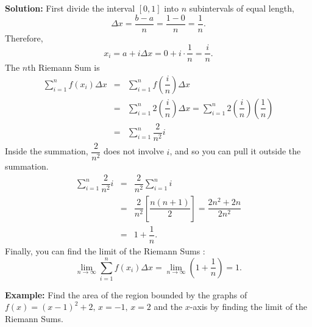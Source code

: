 \documentclass[titlepage,a4paper,12pt]{report}
\begin{document}
\noindent \textbf{Solution:} First divide the interval $[0,1]$ into $n$ subintervals of equal length, 
\begin{equation*}
\Delta x =\dfrac{b-a}{n}=\dfrac{1-0}{n}=\dfrac{1}{n}.
\end{equation*}
Therefore, 
\begin{equation*}
x_i=a+i\Delta x =0+i\cdot \dfrac{1}{n}=\dfrac{i}{n}.
\end{equation*}
The $n$th Riemann Sum is 
\begin{eqnarray*}
\sum _{i=1}^n f(x_i)\Delta x &=& \sum _{i=1}^n f\left(\dfrac{i}{n}\right) \Delta x \\
&=& \sum _{i=1}^n 2\left(\dfrac{i}{n}\right) \Delta x =\sum _{i=1}^n 2\left(\dfrac{i}{n}\right)\left(\dfrac{1}{n}\right)\\
&=&\sum _{i=1}^n \dfrac{2}{n^2}i
\end{eqnarray*}
Inside the summation, $\dfrac{2}{n^2}$ does not involve $i$, and so you can pull it outside the summation.
\begin{eqnarray*}
\sum _{i=1}^n \dfrac{2}{n^2}i &=& \dfrac{2}{n^2}\sum _{i=1}^n i \\
&=& \dfrac{2}{n^2}\left[\dfrac{n(n+1)}{2}\right] =\dfrac{2n^2+2n}{2n^2}\\
&=& 1+\dfrac{1}{n}.
\end{eqnarray*}
Finally, you can find the limit of the Riemann Sums :
\begin{equation*}
\lim _{n\rightarrow \infty} \sum _{i=1}^n f(x_i)\Delta x =\lim _{n\rightarrow \infty} \left(1+\dfrac{1}{n}\right)=1.
\end{equation*}


\noindent \textbf{Example:} Find the area of the region bounded by the graphs of $f(x)=(x-1)^2+2, \, x=-1, \, x=2$ and the $x$-axis by finding the limit of the Riemann Sums.
\end{document}
